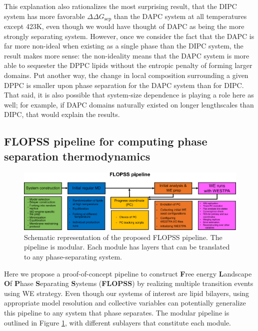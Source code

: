 \documentclass{biophys-new}
\begin{document}
This explanation also rationalizes the most surprising result, that the DIPC system has more favorable $\Delta \Delta G_{\text{sep}}$ than the DAPC system at all temperatures except 423K, even though we would have thought of DAPC as being the more strongly separating system. However, once we consider the fact that the DAPC is far more non-ideal when existing as a single phase than the DIPC system, the result makes more sense: the non-ideality means that the DAPC system is more able to sequester the DPPC lipids without the entropic penalty of forming larger domains. Put another way, the change in local composition surrounding a given DPPC is smaller upon phase separation for the DAPC system than for DIPC. That said, it is also possible that system-size dependence is playing a role here as well; for example, if DAPC domains naturally existed on longer lengthscales than DIPC, that would explain the results.


\subsection*{FLOPSS pipeline for computing phase separation thermodynamics}

\begin{figure}[hbt!]
    \centering
    \includegraphics[width=6.5in]{Figures/Main/9/placeholder.jpg}
    \caption{Schematic representation of the proposed FLOPSS pipeline. The pipeline is modular. Each module has layers that can be translated to any phase-separating system.}
    \label{figs8:view}
\end{figure}

Here we propose a proof-of-concept pipeline to construct \textbf{F}ree energy \textbf{L}andscape \textbf{O}f \textbf{P}hase \textbf{S}eparating \textbf{S}ystems (\textbf{FLOPSS}) by realizing multiple transition events using WE strategy.
Even though our systems of interest are lipid bilayers, using appropriate model resolution and collective variables can potentially generalize this pipeline to any system that phase separates.
The modular pipeline is outlined in Figure \ref{figs8:view}, with different sublayers that constitute each module.
\end{document}
